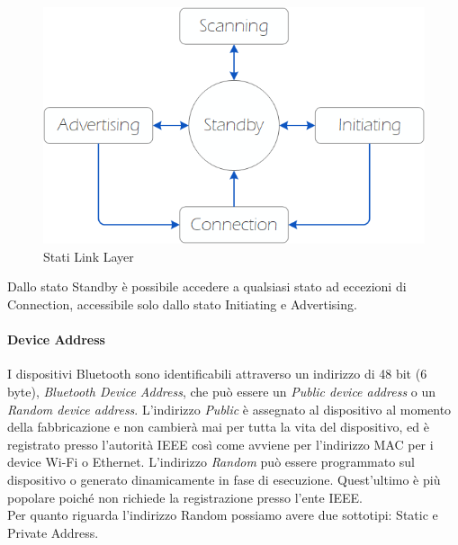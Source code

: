 \begin{figure}[!ht]
    \centering
    \includegraphics[width = \textwidth]{images/Link layer states.png}
    \caption{Stati Link Layer}
    \label{fig:link_layer_states}
\end{figure}

\noindent Dallo stato Standby è possibile accedere a qualsiasi stato ad eccezioni di Connection, accessibile solo dallo stato Initiating e Advertising.

\paragraph{Device Address}
I dispositivi Bluetooth sono identificabili attraverso un indirizzo di 48 bit (6 byte), \textit{Bluetooth Device Address}, che può essere un \textit{Public device address} o un \textit{Random device address}. 
L'indirizzo \textit{Public} è assegnato al dispositivo al momento della fabbricazione e non cambierà mai per tutta la vita del dispositivo, ed è registrato presso l'autorità IEEE così come avviene per l'indirizzo MAC per i device Wi-Fi o Ethernet. 
L'indirizzo \textit{Random} può essere programmato sul dispositivo o generato dinamicamente in fase di esecuzione. Quest'ultimo è più popolare poiché non richiede la registrazione presso l'ente IEEE.\\
Per quanto riguarda l'indirizzo Random possiamo avere due sottotipi: Static e Private Address.

